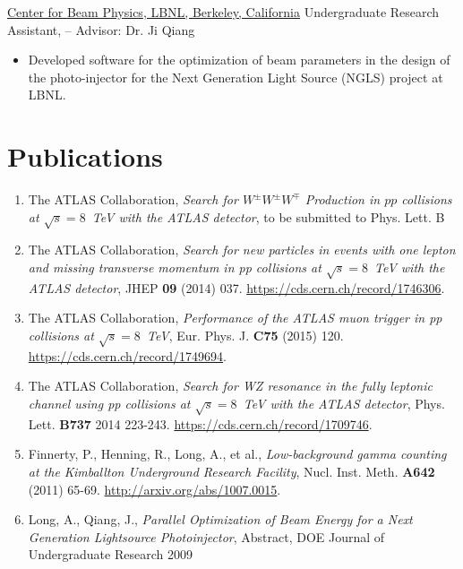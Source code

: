 \href{http://www.cbp.lbl.gov/}{{Center for Beam Physics}, LBNL, Berkeley, California} \newline
Undergraduate Research Assistant,  --  \newline
Advisor: Dr. Ji Qiang 
{\begin{itemize}
\item Developed software for the optimization of beam parameters
in the design of the photo-injector for the Next Generation Light Source (NGLS) project at LBNL.
\end{itemize}
}


\section*{Publications}

\begin{enumerate}
 0cm \linewidth \listindent \dimexpr\linewidth-\listindent\relax
\item[] The ATLAS Collaboration, \emph{Search for $W^{\pm}W^{\pm}W^{\mp}$ Production in $\textit{pp}$ collisions at $\sqrt{s} = 8$~TeV with the ATLAS detector}, to be submitted to Phys. Lett. B
\item[] The ATLAS Collaboration, \emph{Search for new particles in events with one lepton and missing transverse momentum in \textit{pp} collisions at $\sqrt{s} = 8$~TeV with the ATLAS detector},
JHEP \textbf{09} (2014) 037. \href{https://cds.cern.ch/record/1746306}{https://cds.cern.ch/record/1746306}.
\item[] The ATLAS Collaboration, \emph{Performance of the ATLAS muon trigger in \textit{pp} collisions at $\sqrt{s} = 8$~TeV}, Eur. Phys. J. \textbf{C75} (2015) 120. \href{https://cds.cern.ch/record/1749694}{https://cds.cern.ch/record/1749694}.
\item[] The ATLAS Collaboration, \emph{Search for \textit{WZ} resonance in the fully leptonic channel using \textit{pp} collisions at $\sqrt{s} = 8 $~TeV with the ATLAS detector}, Phys. Lett. \textbf{B737} 2014 223-243. \href{https://cds.cern.ch/record/1709746}{https://cds.cern.ch/record/1709746}.
\item[] Finnerty, P., Henning, R., Long, A., et al., \emph{Low-background gamma counting at the Kimballton Underground Research Facility}, Nucl. Inst. Meth. \textbf{A642} (2011) 65-69. \href{http://arxiv.org/abs/1007.0015}{http://arxiv.org/abs/1007.0015}.
\item[] Long, A., Qiang, J., \emph{Parallel Optimization of Beam Energy for a Next Generation Lightsource Photoinjector}, Abstract, DOE Journal of Undergraduate Research 2009
\end{enumerate}


